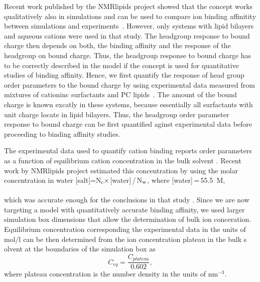 \documentclass[aip,jcp,twocolumn]{revtex4}
\begin{document}
Recent work published by the NMRlipids project showed that the concept works
qualitatively also in simulations and can be used to compare ion binding
affinitity between simulations and experiments~\cite{catte16}.
However, only systems with lipid bilayers and aqueous cations were used in that
study. The headgroup response to bound charge then depends on both, the
binding affinity and the response of the headgroup on bound charge.
Thus, the headgroup response to bound charge has to be correctly
described in the model if the concept is used for quantitative studies of
binding affinity. Hence, we first quantify the response of head group order
parameters to the bound charge by using experimental data measured from mixtures of cationinc surfactants
and PC lipids~\cite{scherer89}. The amount of the bound charge is known excatly in
these systems, because essentially all surfactants with unit charge locate in
lipid bilayers. Thus, the headgroup order parameter response to bound charge can be first
quantified aginst experimental data before proceeding to binding affinity studies.


The experimental data used to quantify cation binding reports
order parameters as a function of equilibrium cation concentration
in the bulk solvent \cite{akutsu81,altenbach84}. Recent work
by NMRlipids project estimated this concentration by using
the molar concentration in water
[salt]=N$_{\rm c} \times$[water]\,/\,N$_{\rm w}$, where [water]\,=\,55.5~M,\\
 \\
which was accurate enough for the conclusions in that study \cite{catte16}.
Since we are now targeting a model with quantitatively accurate binding
affinity, we used larger simulation box dimensions that allow the
determination of bulk ion conceration. Equilibrium concentration
corresponding the experimental data in the units of $\mathrm{mol/l}$
can be then determined from the ion concentration plateau in the bulk s
olvent at the boundaries of the simulation box as
\begin{equation}
\label{eq:conc}
  C_{eq}=\frac{C_{plateau}}{0.602},
\end{equation}
where plateau concentration is the number density in the units of $\mathrm{nm}^{-3}$.
\end{document}
